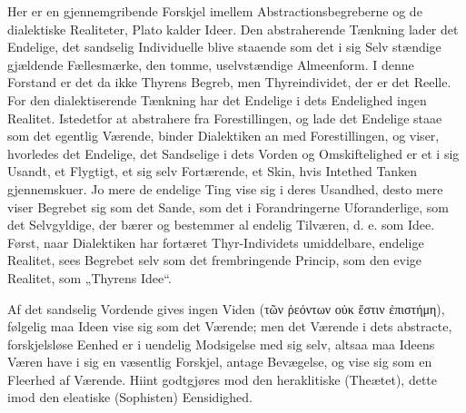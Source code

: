 \documentclass[12pt]{book}
\newcommand{\opage}[1]{\marginnote{\footnotesize\textit{[#1]}}}
\begin{document}
Her er en gjennemgribende Forskjel imellem Abstractionsbegreberne og de dialektiske Realiteter,
Plato kalder Ideer. Den abstraherende Tænkning lader det Endelige, det sandselig Individuelle
blive staaende som det i sig Selv%
\opage{126}stændige gjældende Fællesmærke, den tomme, uselvstændige Almeenform. I denne Forstand er det da
ikke Thyrens Begreb, men Thyreindividet, der er det Reelle. For den dialektiserende Tænkning har
det Endelige i dets Endelighed ingen Realitet. Istedetfor at abstrahere fra Forestillingen, og
lade det Endelige staae som det egentlig Værende, binder Dialektiken an med Forestillingen, og
viser, hvorledes det Endelige, det Sandselige i dets Vorden og Omskiftelighed er et i sig
Usandt, et Flygtigt, et sig selv Fortærende, et Skin, hvis Intethed Tanken gjennemskuer. Jo mere
de endelige Ting vise sig i deres Usandhed, desto mere viser Begrebet sig som det Sande, som det
i Forandringerne Uforanderlige, som det Selvgyldige, der bærer og bestemmer al endelig Tilværen,
d. e. som Idee. Først, naar Dialektiken har fortæret Thyr-Individets umiddelbare, endelige
Realitet, sees Begrebet selv som det frembringende Princip, som den evige Realitet, som „Thyrens
Idee“.

Af det sandselig Vordende gives ingen Viden (τῶν ῥεόντων οὐκ ἔστιν ἐπιστήμη), følgelig maa Ideen
vise sig som det Værende; men det Værende i dets abstracte, forskjelsløse Eenhed er i uendelig
Modsigelse med sig selv, altsaa maa Ideens Væren have i sig en væsentlig Forskjel, antage
Bevægelse, og vise sig som en Fleerhed af Værende. Hiint godtgjøres mod den heraklitiske
(Theætet), dette imod den eleatiske (Sophisten) Eensidighed.
\end{document}
